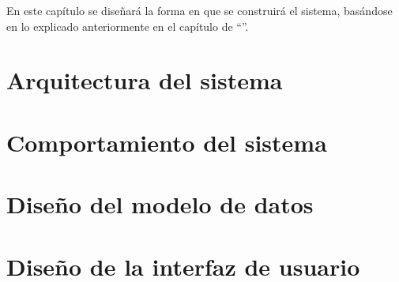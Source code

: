 En este capítulo se diseñará la forma en que se construirá el sistema, basándose en lo explicado anteriormente en el capítulo de ``''.

\section{Arquitectura del sistema}
\label{arquitectura_sistema}


\section{Comportamiento del sistema}
\label{comportamiento_sistema}


\section{Diseño del modelo de datos}
\label{diseno_modelo_datos}


\section{Diseño de la interfaz de usuario}
\label{diseno_interfaz_usuario}
